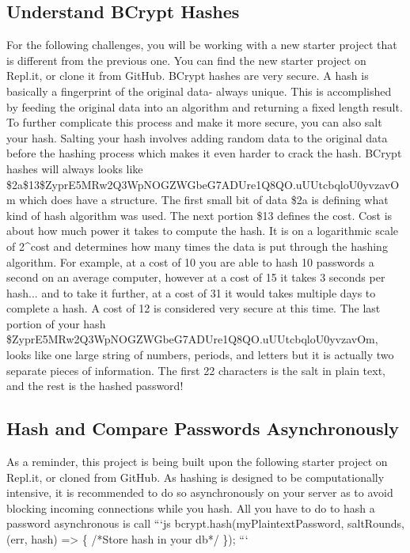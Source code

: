 \documentclass{article}%
\begin{document}
\subsection{Understand BCrypt Hashes}%
\label{subsec:UnderstandBCryptHashes}%
For the following challenges, you will be working with a new starter project that is different from the previous one. You can find the new starter project on Repl.it, or clone it from GitHub.\newline%
BCrypt hashes are very secure. A hash is basically a fingerprint of the original data{-} always unique. This is accomplished by feeding the original data into an algorithm and returning a fixed length result. To further complicate this process and make it more secure, you can also salt your hash. Salting your hash involves adding random data to the original data before the hashing process which makes it even harder to crack the hash.\newline%
BCrypt hashes will always looks like \$2a\$13\$ZyprE5MRw2Q3WpNOGZWGbeG7ADUre1Q8QO.uUUtcbqloU0yvzavOm which does have a structure. The first small bit of data \$2a is defining what kind of hash algorithm was used. The next portion \$13 defines the cost. Cost is about how much power it takes to compute the hash. It is on a logarithmic scale of 2\^{}cost and determines how many times the data is put through the hashing algorithm. For example, at a cost of 10 you are able to hash 10 passwords a second on an average computer, however at a cost of 15 it takes 3 seconds per hash... and to take it further, at a cost of 31 it would takes multiple days to complete a hash. A cost of 12 is considered very secure at this time. The last portion of your hash \$ZyprE5MRw2Q3WpNOGZWGbeG7ADUre1Q8QO.uUUtcbqloU0yvzavOm, looks like one large string of numbers, periods, and letters but it is actually two separate pieces of information. The first 22 characters is the salt in plain text, and the rest is the hashed password!\newline%

%
\subsection{Hash and Compare Passwords Asynchronously}%
\label{subsec:HashandComparePasswordsAsynchronously}%
As a reminder, this project is being built upon the following starter project on Repl.it, or cloned from GitHub.\newline%
As hashing is designed to be computationally intensive, it is recommended to do so asynchronously on your server as to avoid blocking incoming connections while you hash. All you have to do to hash a password asynchronous is call \newline%
```js\newline%
bcrypt.hash(myPlaintextPassword, saltRounds, (err, hash) => \{\newline%
  /*Store hash in your db*/\newline%
\});\newline%
```\newline%
\end{document}
